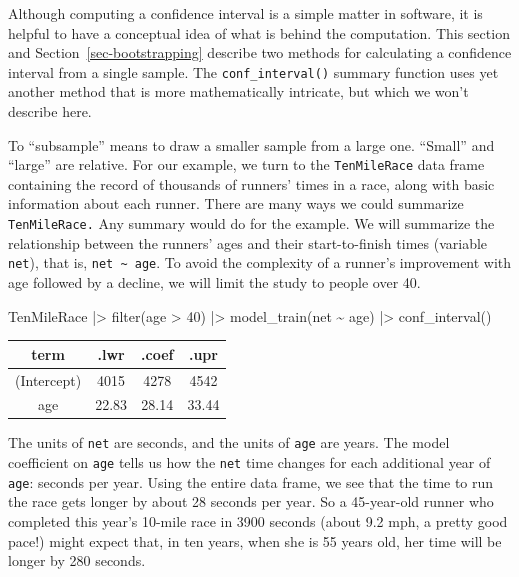 \documentclass[
  letterpaper,
  DIV=11,
  numbers=noendperiod,
  oneside]{scrartcl}
\newenvironment{Shaded}{\begin{snugshade}}{\end{snugshade}}
\newcommand{\DecValTok}[1]{\textcolor[rgb]{0.68,0.00,0.00}{#1}}
\newcommand{\FunctionTok}[1]{\textcolor[rgb]{0.28,0.35,0.67}{#1}}
\newcommand{\NormalTok}[1]{\textcolor[rgb]{0.00,0.23,0.31}{#1}}
\newcommand{\SpecialCharTok}[1]{\textcolor[rgb]{0.37,0.37,0.37}{#1}}
\begin{document}
Although computing a confidence interval is a simple matter in software,
it is helpful to have a conceptual idea of what is behind the
computation. This section and Section~\ref{sec-bootstrapping} describe
two methods for calculating a confidence interval from a single sample.
The \texttt{conf\_interval()} summary function uses yet another method
that is more mathematically intricate, but which we won't describe here.

To ``subsample'' means to draw a smaller sample from a large one.
``Small'' and ``large'' are relative. For our example, we turn to the
\texttt{TenMileRace} data frame containing the record of thousands of
runners' times in a race, along with basic information about each
runner. There are many ways we could summarize \texttt{TenMileRace.} Any
summary would do for the example. We will summarize the relationship
between the runners' ages and their start-to-finish times (variable
\texttt{net}), that is, \texttt{net\ \textasciitilde{}\ age}. To avoid
the complexity of a runner's improvement with age followed by a decline,
we will limit the study to people over 40.

\begin{Shaded}
\begin{Highlighting}[]
\NormalTok{TenMileRace }\SpecialCharTok{|\textgreater{}} 
  \FunctionTok{filter}\NormalTok{(age }\SpecialCharTok{\textgreater{}} \DecValTok{40}\NormalTok{) }\SpecialCharTok{|\textgreater{}}
  \FunctionTok{model\_train}\NormalTok{(net }\SpecialCharTok{\textasciitilde{}}\NormalTok{ age) }\SpecialCharTok{|\textgreater{}} 
  \FunctionTok{conf\_interval}\NormalTok{()}
\end{Highlighting}
\end{Shaded}

\begin{longtable}[]{@{}cccc@{}}
\toprule\noalign{}
term & .lwr & .coef & .upr \\
\midrule\noalign{}
\endhead
\bottomrule\noalign{}
\endlastfoot
(Intercept) & 4015 & 4278 & 4542 \\
age & 22.83 & 28.14 & 33.44 \\
\end{longtable}

The units of \texttt{net} are seconds, and the units of \texttt{age} are
years. The model coefficient on \texttt{age} tells us how the
\texttt{net} time changes for each additional year of \texttt{age}:
seconds per year. Using the entire data frame, we see that the time to
run the race gets longer by about 28 seconds per year. So a 45-year-old
runner who completed this year's 10-mile race in 3900 seconds (about 9.2
mph, a pretty good pace!) might expect that, in ten years, when she is
55 years old, her time will be longer by 280 seconds.
\end{document}
